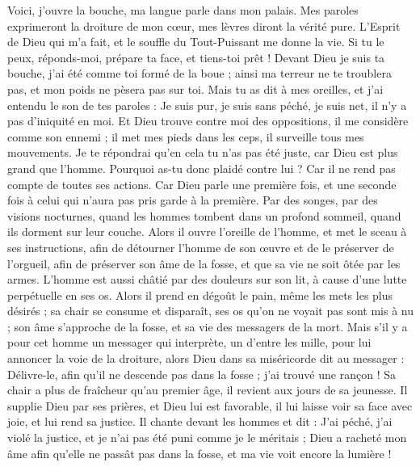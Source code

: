 \begin{multicols}{2}
Voici, j'ouvre la bouche, ma langue parle dans mon palais.
Mes paroles exprimeront la droiture de mon cœur, mes lèvres diront la vérité pure.
L'Esprit de Dieu qui m'a fait, et le souffle du Tout-Puissant me donne la vie.
Si tu le peux, réponds-moi, prépare ta face, et tiens-toi prêt !
Devant Dieu je suis ta bouche, j'ai été comme toi formé de la boue ;
ainsi ma terreur ne te troublera pas, et mon poids ne pèsera pas sur toi.
Mais tu as dit à mes oreilles, et j'ai entendu le son de tes paroles :
Je suis pur, je suis sans péché, je suis net, il n'y a pas d'iniquité en moi.
Et Dieu trouve contre moi des oppositions, il me considère comme son ennemi ;
il met mes pieds dans les ceps, il surveille tous mes mouvements.
Je te répondrai qu'en cela tu n'as pas été juste, car Dieu est plus grand que l'homme.
Pourquoi as-tu donc plaidé contre lui ? Car il ne rend pas compte de toutes ses actions.
Car Dieu parle une première fois, et une seconde fois à celui qui n'aura pas pris garde à la première.
Par des songes, par des visions nocturnes, quand les hommes tombent dans un profond sommeil, quand ils dorment sur leur couche.
Alors il ouvre l'oreille de l'homme, et met le sceau à ses instructions,
afin de détourner l'homme de son œuvre et de le préserver de l'orgueil,
afin de préserver son âme de la fosse, et que sa vie ne soit ôtée par les armes.
L'homme est aussi châtié par des douleurs sur son lit, à cause d'une lutte perpétuelle en ses os.
Alors il prend en dégoût le pain, même les mets les plus désirés ;
sa chair se consume et disparaît, ses os qu'on ne voyait pas sont mis à nu ;
son âme s'approche de la fosse, et sa vie des messagers de la mort.
Mais s'il y a pour cet homme un messager qui interprète, un d'entre les mille, pour lui annoncer la voie de la droiture,
alors Dieu dans sa miséricorde dit au messager : Délivre-le, afin qu'il ne descende pas dans la fosse ; j'ai trouvé une rançon !
Sa chair a plus de fraîcheur qu'au premier âge, il revient aux jours de sa jeunesse.
Il supplie Dieu par ses prières, et Dieu lui est favorable, il lui laisse voir sa face avec joie, et lui rend sa justice.
Il chante devant les hommes et dit : J'ai péché, j'ai violé la justice, et je n'ai pas été puni comme je le méritais ;
Dieu a racheté mon âme afin qu'elle ne passât pas dans la fosse, et ma vie voit encore la lumière !

\end{multicols}
